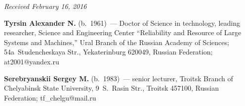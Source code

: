 \vspace*{-9pt}

\hfill{\small\textit{Received February 16, 2016}}

\vspace*{-24pt}

\Contr

\noindent
\textbf{Tyrsin Alexander N.} (b.\ 1961)~--- Doctor of Science in technology, leading 
researcher, Science and Engineering Center ``Reliability and Resource of Large 
Systems and Machines,'' Ural Branch of the Russian Academy of Sciences; 
54a~Studencheskaya Str., Yekaterinburg 620049, Russian Federation; 
at2001@yandex.ru


\noindent
\textbf{Serebryanskii Sergey M.} (b.\ 1983)~--- senior lecturer, Troitsk Branch of 
Chelyabinsk State University, 9~S.~Rasin Str., Troitsk 457100, Russian Federation; 
tf\_chelgu@mail.ru

\label{end\stat}


\renewcommand{\bibname}{\protect\rm Литература}
   